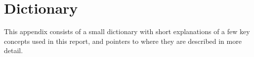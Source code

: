 \documentclass[a4paper,11pt]{kth-mag}
\begin{document}







\appendix
\addappheadtotoc

\chapter{Dictionary} \label{appendix-dictionary}

This appendix consists of a small dictionary with short explanations of a few
key concepts used in this report, and pointers to where they are described in
more detail.
\end{document}
